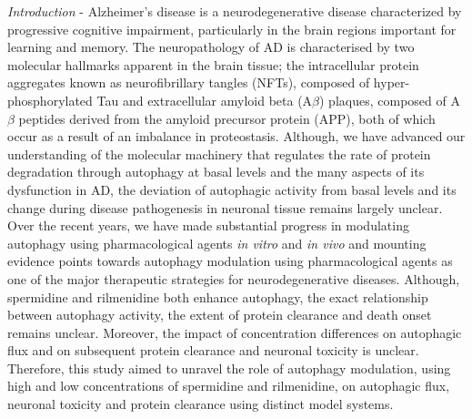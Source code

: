 \textit{Introduction} - Alzheimer’s disease is a neurodegenerative disease characterized by progressive cognitive impairment, particularly in the brain regions important for learning and memory. The neuropathology of AD is characterised by two molecular hallmarks apparent in the brain tissue; the intracellular protein aggregates known as neurofibrillary tangles (NFTs), composed of hyper-phosphorylated Tau and extracellular amyloid beta (A$\beta$) plaques, composed of A$\beta$ peptides derived from the amyloid precursor protein (APP), both of which occur as a result of an imbalance in proteostasis. Although, we have advanced our understanding of the molecular machinery that regulates the rate of protein degradation through autophagy at basal levels and the many aspects of its dysfunction in AD, the deviation of autophagic activity from basal levels and its change during disease pathogenesis in neuronal tissue remains largely unclear. Over the recent years, we have made substantial progress in modulating autophagy using pharmacological agents \textit{in vitro} and \textit{in vivo} and mounting evidence points towards autophagy modulation using pharmacological agents as one of the major therapeutic strategies for neurodegenerative diseases. Although, spermidine and rilmenidine both enhance autophagy, the exact relationship between autophagy activity, the extent of protein clearance and death onset remains unclear. Moreover, the impact of concentration differences on autophagic flux and on subsequent protein clearance and neuronal toxicity is unclear. Therefore, this study aimed to unravel the role of autophagy modulation, using high and low concentrations of spermidine and rilmenidine, on autophagic flux, neuronal toxicity and protein clearance using distinct model systems. 


